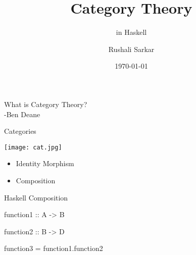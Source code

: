 \documentclass[14pt]{beamer}
\title{Category Theory}
\subtitle{in Haskell}
\author{Rushali Sarkar}
\date{\today}
\begin{document}
\begin{frame}[plain]
\maketitle
\end{frame}

\begin{frame}{What is Category Theory?}
  \\
   \hspace{7cm} -Ben Deane
\end{frame}


\begin{frame}{Categories}
\begin{center}
    \texttt{[image: cat.jpg]}
\end{center}
\begin{itemize}
  \item Identity Morphism
  \item Composition
 \end{itemize}
\end{frame}

\begin{frame}{Haskell Composition}
 \begin{fullpageitemize}
  \item {function1 :: A -> B}
  \item {function2 :: B -> D}
  \item {function3 = function1.function2}
 \end{fullpageitemize}
\end{frame}

\end{document}
